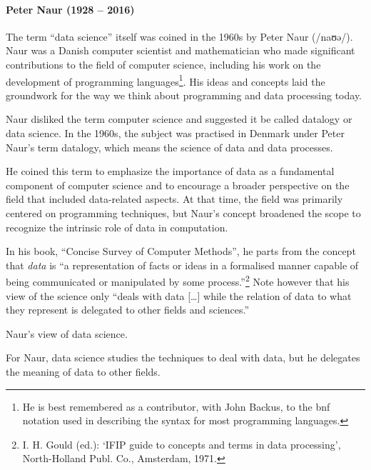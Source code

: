 
\paragraph{Peter Naur (1928 -- 2016)}

The term ``data science'' itself was coined in the 1960s by Peter Naur (/naʊə/). Naur was
a Danish computer scientist and mathematician who made significant contributions to the
field of computer science, including his work on the development of programming
languages\footnote{He is best remembered as a contributor, with John Backus, to the
\gls{bnf} notation used in describing the syntax for most programming
languages.}.
His ideas and concepts laid the groundwork for the way we think about programming and data
processing today.

Naur disliked the term computer science and suggested it be called datalogy or data
science.  In the 1960s, the subject was practised in Denmark under Peter
Naur's term datalogy, which means the science of data and data processes.

He coined this term to emphasize the importance of data as a fundamental component of
computer science and to encourage a broader perspective on the field that included
data-related aspects. At that time, the field was primarily centered on programming
techniques, but Naur's concept broadened the scope to recognize the intrinsic role of data
in computation.

In his book, ``Concise Survey of Computer Methods'', he
parts from the concept that \emph{data} is ``a representation of facts or ideas in a
formalised manner capable of being communicated or manipulated by some
process.''\footnote{I. H. Gould (ed.): ‘IFIP guide to concepts and terms in data
processing’, North-Holland Publ. Co., Amsterdam, 1971.} Note however that his view of the
science only ``deals with data [\dots] while the relation of data to what they represent
is delegated to other fields and sciences.''

\begin{figurebox}[label=fig:naur]{Naur's view of data science.}
  \centering
  \tcblower
    For Naur, data science studies the techniques to deal
    with data, but he delegates the meaning of data to other fields.
\end{figurebox}

